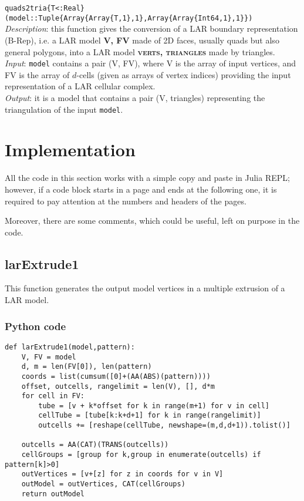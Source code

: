 \documentclass[a4paper,12pt,titlepage]{article}					%
\begin{document}
\texttt{quads2tria\{T<:Real\}(model::Tuple\{Array\{Array\{T,1\},1\},Array\{Array\{Int64,1\},1\}\})}
\\
\emph{Description}: this function gives the conversion of a LAR boundary representation (B-Rep), i.e. a LAR model \textbf{\textsc{V, FV}} made of 2D faces, usually quads but also general polygons, into a LAR model \textbf{\textsc{verts, triangles}} made by triangles.
\\
\emph{Input}: \texttt{model} contains a pair (V, FV), where V is the array of input vertices, and FV is the array of $d$-cells (given as arrays of vertex indices) providing the input representation of a LAR cellular complex.
\\
\emph{Output}: it is a model that contains a pair (V, triangles) representing the triangulation of the input \texttt{model}.


\section{Implementation}
All the code in this section works with a simple copy and paste in Julia REPL; however, if a code block starts in a page and ends at the following one, it is required to pay attention at the numbers and headers of the pages.

Moreover, there are some comments, which could be useful, left on purpose in the code.

\subsection{larExtrude1}
This function generates the output model vertices in a multiple extrusion of a LAR model.

\subsubsection{Python code}
\begin{verbatim}
def larExtrude1(model,pattern):
    V, FV = model
    d, m = len(FV[0]), len(pattern)
    coords = list(cumsum([0]+(AA(ABS)(pattern))))
    offset, outcells, rangelimit = len(V), [], d*m
    for cell in FV:
        tube = [v + k*offset for k in range(m+1) for v in cell]
        cellTube = [tube[k:k+d+1] for k in range(rangelimit)]
        outcells += [reshape(cellTube, newshape=(m,d,d+1)).tolist()]
        
    outcells = AA(CAT)(TRANS(outcells))
    cellGroups = [group for k,group in enumerate(outcells) if pattern[k]>0]
    outVertices = [v+[z] for z in coords for v in V]
    outModel = outVertices, CAT(cellGroups)
    return outModel
\end{verbatim}
\end{document}

